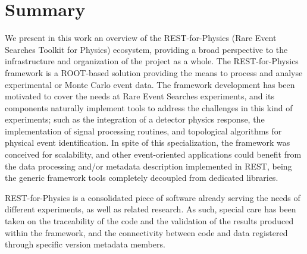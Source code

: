 \section{Summary}





We present in this work an overview of the REST-for-Physics (Rare Event Searches Toolkit for Physics) ecosystem, providing a broad perspective to the infrastructure and organization of the project as a whole. The REST-for-Physics framework is a ROOT-based solution providing the means to process and analyse experimental or Monte Carlo event data. The framework development has been motivated to cover the needs at Rare Event Searches experiments, and its components naturally implement tools to address the challenges in this kind of experiments; such as the integration of a detector physics response, the implementation of signal processing routines, and topological algorithms for physical event identification. In spite of this specialization, the framework was conceived for scalability, and other event-oriented applications could benefit from the data processing and/or metadata description implemented in REST, being the generic framework tools completely decoupled from dedicated libraries.

REST-for-Physics is a consolidated piece of software already serving the needs of different experiments, as well as related research. As such, special care has been taken on the traceability of the code and the validation of the results produced within the framework, and the connectivity between code and data registered through specific version metadata members.